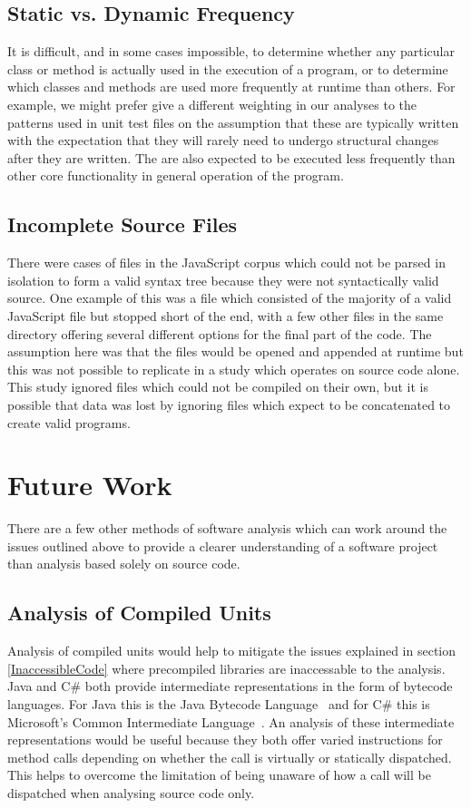 \subsection{Static vs. Dynamic Frequency}
It is difficult, and in some cases impossible, to determine whether any particular class or method is actually used in the execution of a program, or to determine which classes and methods are used more frequently at runtime than others. For example, we might prefer give a different weighting in our analyses to the patterns used in unit test files on the assumption that these are typically written with the expectation that they will rarely need to undergo structural changes after they are written. The are also expected to be executed less frequently than other core functionality in general operation of the program.

\subsection{Incomplete Source Files}
There were cases of files in the JavaScript corpus which could not be parsed in isolation to form a valid syntax tree because they were not syntactically valid source. One example of this was a file which consisted of the majority of a valid JavaScript file but stopped short of the end, with a few other files in the same directory offering several different options for the final part of the code. The assumption here was that the files would be opened and appended at runtime but this was not possible to replicate in a study which operates on source code alone. This study ignored files which could not be compiled on their own, but it is possible that data was lost by ignoring files which expect to be concatenated to create valid programs.

\section{Future Work}
There are a few other methods of software analysis which can work around the issues outlined above to provide a clearer understanding of a software project than analysis based solely on source code.

\subsection{Analysis of Compiled Units}
Analysis of compiled units would help to mitigate the issues explained in section \ref{InaccessibleCode} where precompiled libraries are inaccessable to the analysis. Java and C\# both provide intermediate representations in the form of bytecode languages. For Java this is the Java Bytecode Language~\cite{JVMSpec} and for C\# this is Microsoft's Common Intermediate Language~\cite{CommonIntermediateLanguage}. An analysis of these intermediate representations would be useful because they both offer varied instructions for method calls depending on whether the call is virtually or statically dispatched. This helps to overcome the limitation of being unaware of how a call will be dispatched when analysing source code only.

